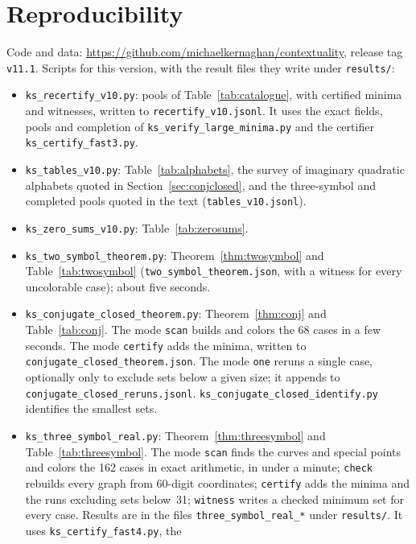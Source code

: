 \section{Reproducibility}\label{app:repro}

Code and data: \url{https://github.com/michaelkernaghan/contextuality}, release tag
\texttt{v11.1}.  Scripts for this
version, with the result files they write under \texttt{results/}:

\begin{itemize}\setlength{\itemsep}{0pt}
\item \texttt{ks\_recertify\_v10.py}: pools of Table~\ref{tab:catalogue}, with certified minima
and witnesses, written to \texttt{recertify\_v10.jsonl}.  It uses the exact fields, pools and
completion of \texttt{ks\_verify\_large\_minima.py} and the certifier
\texttt{ks\_certify\_fast3.py}.
\item \texttt{ks\_tables\_v10.py}: Table~\ref{tab:alphabets}, the survey of imaginary quadratic
alphabets quoted in Section~\ref{sec:conjclosed}, and the three-symbol and completed pools
quoted in the text (\texttt{tables\_v10.jsonl}).
\item \texttt{ks\_zero\_sums\_v10.py}: Table~\ref{tab:zerosums}.
\item \texttt{ks\_two\_symbol\_theorem.py}: Theorem~\ref{thm:twosymbol} and
Table~\ref{tab:twosymbol} (\texttt{two\_symbol\_theorem.json}, with a witness for every
uncolorable case); about five seconds.
\item \texttt{ks\_conjugate\_closed\_theorem.py}: Theorem~\ref{thm:conj} and
Table~\ref{tab:conj}.  The mode \texttt{scan} builds and colors the 68 cases in a few seconds.
The mode \texttt{certify} adds the minima, written to
\texttt{conjugate\_closed\_theorem.json}.  The mode \texttt{one} reruns a single case,
optionally only to exclude sets below a given size; it appends to
\texttt{conjugate\_closed\_reruns.jsonl}.  \texttt{ks\_conjugate\_closed\_identify.py}
identifies the smallest sets.
\item \texttt{ks\_three\_symbol\_real.py}: Theorem~\ref{thm:threesymbol} and
Table~\ref{tab:threesymbol}.  The mode \texttt{scan} finds the curves and special points and
colors the 162 cases in exact arithmetic, in under a minute; \texttt{check} rebuilds every
graph from 60-digit coordinates; \texttt{certify} adds the minima and the runs excluding sets
below~31; \texttt{witness} writes a checked minimum set for every case.  Results are in the
files \texttt{three\_symbol\_real\_*} under \texttt{results/}.  It uses \texttt{ks\_certify\_fast4.py}, the

\end{itemize}
